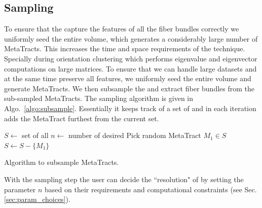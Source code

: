 \subsection {Sampling \mt}\label{subsec:sampling_mt}
To ensure that the \mt capture the features of all the fiber bundles correctly we uniformly seed the entire volume, which generates a considerably large number of MetaTracts. This increases the time and space requirements of the technique. Specially during orientation clustering which performs eigenvalue and eigenvector computations on large matrices. To ensure that we can handle large datasets and at the same time preserve all features, we uniformly seed the entire volume and generate MetaTracts. We then subsample the \mt and extract fiber bundles from the sub-sampled MetaTracts.
The sampling algorithm is given in Algo.~\ref{algo:subsample}. Essentially it keeps track of a set of \mt and in each iteration adds the MetaTract furthest from the current set. 
\begin{algorithm}
	$S \leftarrow$ set of all \mt\;
	$n \leftarrow$ number of desired \mt\;
	Pick random MetaTract $M_1 \in S$\;
	$S \leftarrow S -\{M_1\}$\;
	\caption{Algorithm to subsample MetaTracts.}
	\label{algo:subsample}
\end{algorithm}
With the sampling step the user can decide the ``resolution" of \mt by setting the parameter $n$ based on their requirements and computational constraints (see Sec.\ref{sec:param_choices}).
